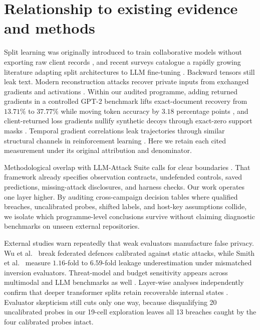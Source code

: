 \section{Relationship to existing evidence and methods}
\label{sec:related}

Split learning was originally introduced to train collaborative models
without exporting raw client records \cite{vepakomma2018}, and recent
surveys catalogue a rapidly growing literature adapting split architectures
to LLM fine-tuning \cite{splitsurvey2026}. Backward tensors still leak
text. Modern reconstruction attacks recover private inputs from exchanged
gradients and activations \cite{gisurvey2022,dager2024,fedspy2026}. Within
our audited programme, adding returned gradients in a controlled GPT-2
benchmark lifts exact-document recovery from $13.71\%$ to $37.77\%$ while
moving token accuracy by $3.18$ percentage points \cite{gradients2026}, and
client-returned loss gradients nullify synthetic decoys through exact-zero
support masks \cite{paper1}. Temporal gradient correlations leak
trajectories through similar structural channels in reinforcement learning
\cite{trace2026}. Here we retain each cited measurement under its original
attribution and denominator.

Methodological overlap with LLM-Attack Suite calls for clear boundaries
\cite{suite2026}. That framework already specifies observation contracts,
undefended controls, saved predictions, missing-attack disclosures, and
harness checks. Our work operates one layer higher. By auditing
cross-campaign decision tables where qualified breaches, uncalibrated
probes, shifted labels, and host-key assumptions collide, we isolate which
programme-level conclusions survive without claiming diagnostic benchmarks
on unseen external repositories.

External studies warn repeatedly that weak evaluators manufacture false
privacy. Wu et al.\ \cite{adaptive2022} break federated defences calibrated
against static attacks, while Smith et al.\ \cite{mia2026} measure
$1.16$-fold to $6.59$-fold leakage underestimation under mismatched
inversion evaluators. Threat-model and budget sensitivity appears across
multimodal and LLM benchmarks as well \cite{labelbudget2026,ablation2026}.
Layer-wise analyses independently confirm that deeper transformer splits
retain recoverable internal states
\cite{depth2025,actinv2026,bettisplit2026}. Evaluator skepticism still cuts
only one way, because disqualifying 20 uncalibrated probes in our 19-cell
exploration leaves all 13 breaches caught by the four calibrated probes
intact.

